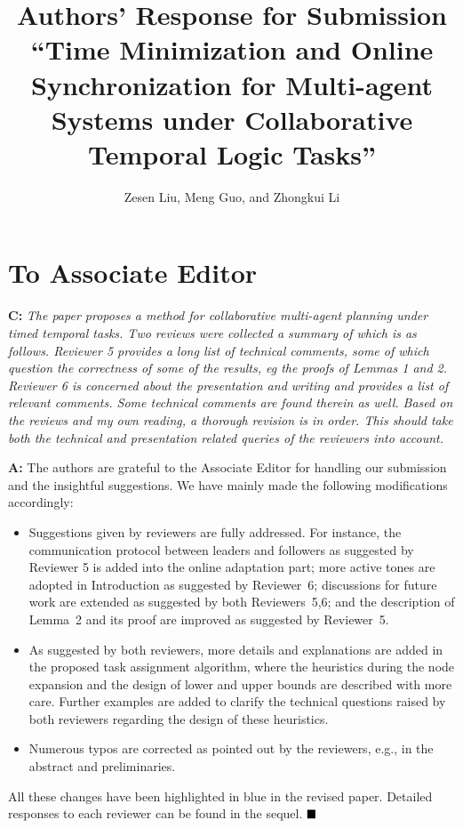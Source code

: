 \documentclass[10pt]{article}
\begin{document}
\title{Authors' Response for Submission ``Time Minimization and Online Synchronization for Multi-agent Systems
	under Collaborative Temporal Logic Tasks''}
\author{Zesen Liu, Meng Guo, and Zhongkui Li}
\date{}
\maketitle



\section*{To Associate Editor}


\textbf{C:}
\emph{The paper proposes a method for collaborative multi-agent planning
under timed temporal tasks. Two reviews were collected a summary of
which is as follows. Reviewer 5 provides a long list of technical
comments, some of which question the correctness of some of the
results, eg the proofs of Lemmas 1 and 2. Reviewer 6 is concerned about
the presentation and writing and provides a list of relevant comments.
Some technical comments are found therein as well. Based on the reviews
and my own reading, a thorough revision is in order. This should take
both the technical and presentation related queries of the reviewers
into account.
}

\textbf{A:}
The authors are grateful to the Associate Editor for handling our submission and the insightful suggestions.
We have mainly made the following modifications accordingly:
\begin{itemize}
\item Suggestions given by reviewers are fully addressed.
  For instance, the communication protocol between leaders and followers
  as suggested by Reviewer 5
  is added into the online adaptation part;
  more active tones are adopted in Introduction as suggested by Reviewer~6;
 discussions for future work are extended as suggested by both Reviewers~5,6;
  and the description of Lemma~2 and its proof are improved as suggested by Reviewer~5.

\item As suggested by both reviewers,
  more details and explanations are added in the proposed task assignment algorithm,
  where the heuristics during the node expansion and the design of lower
  and upper bounds are described with more care.
  Further examples are added to clarify the technical questions
  raised by both reviewers regarding the design of these heuristics.

\item Numerous typos are corrected as pointed out by the reviewers, e.g., in the abstract and preliminaries.
\end{itemize}
All these changes have been highlighted in blue in the revised paper.
Detailed responses to each reviewer can be found in the sequel.
$\hfill\blacksquare$
\end{document}
